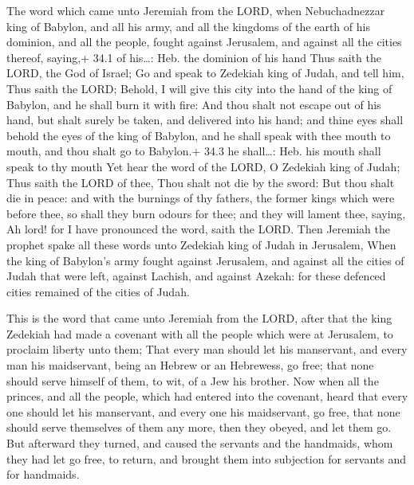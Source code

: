  The word which came unto Jeremiah from the LORD, when
Nebuchadnezzar king of Babylon, and all his army, and all the kingdoms
of the earth of his dominion, and all the people, fought against
Jerusalem, and against all the cities thereof, saying,+ 34.1 of
his\ldots: Heb. the dominion of his hand  Thus saith the
LORD, the God of Israel; Go and speak to Zedekiah king of Judah, and
tell him, Thus saith the LORD; Behold, I will give this city into the
hand of the king of Babylon, and he shall burn it with fire:
 And thou shalt not escape out of his hand, but shalt surely
be taken, and delivered into his hand; and thine eyes shall behold the
eyes of the king of Babylon, and he shall speak with thee mouth to
mouth, and thou shalt go to Babylon.+ 34.3 he shall\ldots: Heb. his
mouth shall speak to thy mouth  Yet hear the word of the
LORD, O Zedekiah king of Judah; Thus saith the LORD of thee, Thou shalt
not die by the sword:  But thou shalt die in peace: and with
the burnings of thy fathers, the former kings which were before thee, so
shall they burn odours for thee; and they will lament thee, saying, Ah
lord! for I have pronounced the word, saith the LORD.  Then
Jeremiah the prophet spake all these words unto Zedekiah king of Judah
in Jerusalem,  When the king of Babylon's army fought
against Jerusalem, and against all the cities of Judah that were left,
against Lachish, and against Azekah: for these defenced cities remained
of the cities of Judah.

 This is the word that came unto Jeremiah from the LORD,
after that the king Zedekiah had made a covenant with all the people
which were at Jerusalem, to proclaim liberty unto them; 
That every man should let his manservant, and every man his maidservant,
being an Hebrew or an Hebrewess, go free; that none should serve himself
of them, to wit, of a Jew his brother.  Now when all the
princes, and all the people, which had entered into the covenant, heard
that every one should let his manservant, and every one his maidservant,
go free, that none should serve themselves of them any more, then they
obeyed, and let them go.  But afterward they turned, and
caused the servants and the handmaids, whom they had let go free, to
return, and brought them into subjection for servants and for handmaids.

